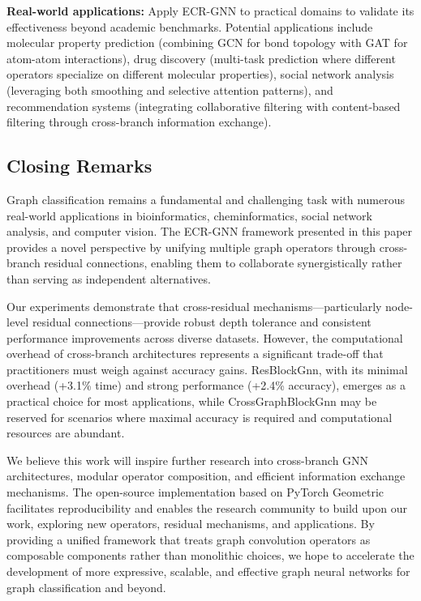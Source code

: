 \textbf{Real-world applications:} Apply ECR-GNN to practical domains to validate its effectiveness beyond academic benchmarks. Potential applications include molecular property prediction (combining GCN for bond topology with GAT for atom-atom interactions), drug discovery (multi-task prediction where different operators specialize on different molecular properties), social network analysis (leveraging both smoothing and selective attention patterns), and recommendation systems (integrating collaborative filtering with content-based filtering through cross-branch information exchange).

\subsection{Closing Remarks}

Graph classification remains a fundamental and challenging task with numerous real-world applications in bioinformatics, cheminformatics, social network analysis, and computer vision. The ECR-GNN framework presented in this paper provides a novel perspective by unifying multiple graph operators through cross-branch residual connections, enabling them to collaborate synergistically rather than serving as independent alternatives.

Our experiments demonstrate that cross-residual mechanisms---particularly node-level residual connections---provide robust depth tolerance and consistent performance improvements across diverse datasets. However, the computational overhead of cross-branch architectures represents a significant trade-off that practitioners must weigh against accuracy gains. ResBlockGnn, with its minimal overhead (+3.1\% time) and strong performance (+2.4\% accuracy), emerges as a practical choice for most applications, while CrossGraphBlockGnn may be reserved for scenarios where maximal accuracy is required and computational resources are abundant.

We believe this work will inspire further research into cross-branch GNN architectures, modular operator composition, and efficient information exchange mechanisms. The open-source implementation based on PyTorch Geometric facilitates reproducibility and enables the research community to build upon our work, exploring new operators, residual mechanisms, and applications. By providing a unified framework that treats graph convolution operators as composable components rather than monolithic choices, we hope to accelerate the development of more expressive, scalable, and effective graph neural networks for graph classification and beyond.
